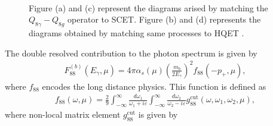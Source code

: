 \begin{figure}[H]
\\
\caption{\label{fig:Q8Q8}Figure (a) and (c) represent the diagrams arised by matching the $Q_{8\gamma}-Q_{8g}$ operator to SCET. Figure (b) and (d) represents the diagrams obtained by matching same processes to HQET \cite{Benzke:2010js}.}
\end{figure} 
The double resolved contribution to the photon spectrum is given by \cite{Benzke:2010js}
\begin{eqnarray}
F_{88}^{(b)}\left(E_{\gamma}, \mu\right)=4 \pi \alpha_{s}(\mu)\left(\frac{m_{b}}{2 E_{\gamma}}\right)^{2} f_{88}\left(-p_{+}, \mu\right),
\end{eqnarray}
where $f_{88}$ encodes the long distance physics. This function is defined as 
\begin{eqnarray}
f_{88}(\omega, \mu)=\frac{2}{9} \int_{-\infty}^{\infty} \frac{d \omega_{1}}{\omega_{1}+i \varepsilon} \int_{-\infty}^{\infty} \frac{d \omega_{2}}{\omega_{2}-i \varepsilon} g_{88}^{\mathrm{cut}}\left(\omega, \omega_{1}, \omega_{2}, \mu\right),
\end{eqnarray}
where non-local matrix element $ g_{88}^{\mathrm{cut}}$ is given by

